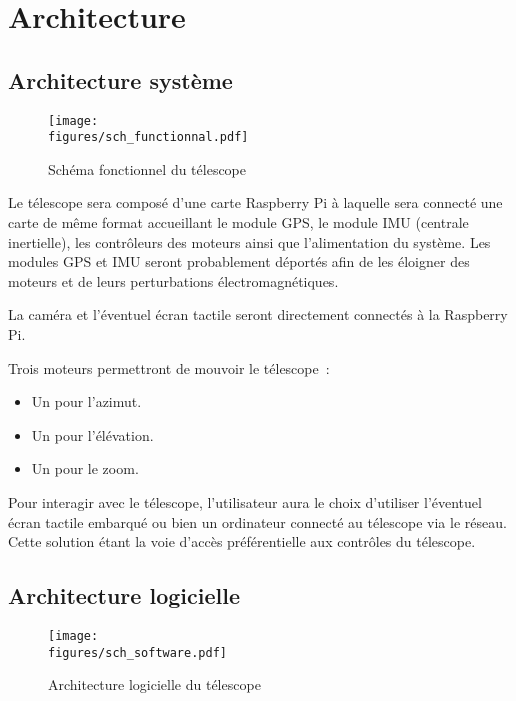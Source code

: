 \chapter{Architecture}

\section{Architecture système}

\begin{figure}[H]
    \centering
    \texttt{[image: \\figures/sch\_functionnal.pdf]}
    \decoRule
    \caption[
    Schéma fonctionnel du télescope]{
    Schéma fonctionnel du télescope}
    \label{fig:Schéma fonctionnel du télescope}
    \end{figure}

\vspace{1cm}

Le télescope sera composé d'une carte Raspberry Pi à laquelle sera connecté une carte de même format accueillant le module GPS, le module IMU (centrale inertielle), les contrôleurs des moteurs ainsi que l'alimentation du système. Les modules GPS et IMU seront probablement déportés afin de les éloigner des moteurs et de leurs perturbations électromagnétiques.

La caméra et l'éventuel écran tactile seront directement connectés à la Raspberry Pi.

Trois moteurs permettront de mouvoir le télescope~:
\begin{itemize}[label=$\bullet$]
	\item Un pour l'azimut.
	\item Un pour l'élévation.
	\item Un pour le zoom.
	\end{itemize}

\vspace{1cm}

Pour interagir avec le télescope, l'utilisateur aura le choix d'utiliser l'éventuel écran tactile embarqué ou bien un ordinateur connecté au télescope via le réseau. Cette solution étant la voie d'accès préférentielle aux contrôles du télescope.

\section{Architecture logicielle}

\begin{figure}[H]
    \centering
    \texttt{[image: \\figures/sch\_software.pdf]}
    \decoRule
    \caption[
    Architecture logicielle du télescope]{
    Architecture logicielle du télescope}
    \label{fig:Architecture logicielle du télescope}
    \end{figure}

